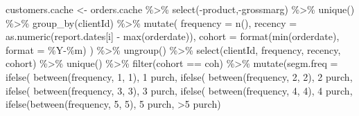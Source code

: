 \documentclass[
]{book}
\newenvironment{Shaded}{\begin{snugshade}}{\end{snugshade}}
\newcommand{\AttributeTok}[1]{\textcolor[rgb]{0.77,0.63,0.00}{#1}}
\newcommand{\DecValTok}[1]{\textcolor[rgb]{0.00,0.00,0.81}{#1}}
\newcommand{\FunctionTok}[1]{\textcolor[rgb]{0.00,0.00,0.00}{#1}}
\newcommand{\NormalTok}[1]{#1}
\newcommand{\OtherTok}[1]{\textcolor[rgb]{0.56,0.35,0.01}{#1}}
\newcommand{\SpecialCharTok}[1]{\textcolor[rgb]{0.00,0.00,0.00}{#1}}
\newcommand{\StringTok}[1]{\textcolor[rgb]{0.31,0.60,0.02}{#1}}
\begin{document}
\begin{Shaded}
\begin{Highlighting}[]
\NormalTok{    customers.cache }\OtherTok{\textless{}{-}}\NormalTok{ orders.cache }\SpecialCharTok{\%\textgreater{}\%}
        \FunctionTok{select}\NormalTok{(}\SpecialCharTok{{-}}\NormalTok{product,}\SpecialCharTok{{-}}\NormalTok{grossmarg) }\SpecialCharTok{\%\textgreater{}\%}
        \FunctionTok{unique}\NormalTok{() }\SpecialCharTok{\%\textgreater{}\%}
        \FunctionTok{group\_by}\NormalTok{(clientId) }\SpecialCharTok{\%\textgreater{}\%}
        \FunctionTok{mutate}\NormalTok{(}
            \AttributeTok{frequency =} \FunctionTok{n}\NormalTok{(),}
            \AttributeTok{recency =} \FunctionTok{as.numeric}\NormalTok{(report.dates[i] }\SpecialCharTok{{-}} \FunctionTok{max}\NormalTok{(orderdate)),}
            \AttributeTok{cohort =} \FunctionTok{format}\NormalTok{(}\FunctionTok{min}\NormalTok{(orderdate), }\AttributeTok{format =} \StringTok{\textquotesingle{}\%Y{-}\%m\textquotesingle{}}\NormalTok{)}
\NormalTok{        ) }\SpecialCharTok{\%\textgreater{}\%}
        \FunctionTok{ungroup}\NormalTok{() }\SpecialCharTok{\%\textgreater{}\%}
        \FunctionTok{select}\NormalTok{(clientId, frequency, recency, cohort) }\SpecialCharTok{\%\textgreater{}\%}
        \FunctionTok{unique}\NormalTok{() }\SpecialCharTok{\%\textgreater{}\%}
        \FunctionTok{filter}\NormalTok{(cohort }\SpecialCharTok{==}\NormalTok{ coh) }\SpecialCharTok{\%\textgreater{}\%}
        \FunctionTok{mutate}\NormalTok{(}\AttributeTok{segm.freq =} \FunctionTok{ifelse}\NormalTok{(}
            \FunctionTok{between}\NormalTok{(frequency, }\DecValTok{1}\NormalTok{, }\DecValTok{1}\NormalTok{),}
            \StringTok{\textquotesingle{}1 purch\textquotesingle{}}\NormalTok{,}
            \FunctionTok{ifelse}\NormalTok{(}
                \FunctionTok{between}\NormalTok{(frequency, }\DecValTok{2}\NormalTok{, }\DecValTok{2}\NormalTok{),}
                \StringTok{\textquotesingle{}2 purch\textquotesingle{}}\NormalTok{,}
                \FunctionTok{ifelse}\NormalTok{(}
                    \FunctionTok{between}\NormalTok{(frequency, }\DecValTok{3}\NormalTok{, }\DecValTok{3}\NormalTok{),}
                    \StringTok{\textquotesingle{}3 purch\textquotesingle{}}\NormalTok{,}
                    \FunctionTok{ifelse}\NormalTok{(}
                        \FunctionTok{between}\NormalTok{(frequency, }\DecValTok{4}\NormalTok{, }\DecValTok{4}\NormalTok{),}
                        \StringTok{\textquotesingle{}4 purch\textquotesingle{}}\NormalTok{,}
                        \FunctionTok{ifelse}\NormalTok{(}\FunctionTok{between}\NormalTok{(frequency, }\DecValTok{5}\NormalTok{, }\DecValTok{5}\NormalTok{), }\StringTok{\textquotesingle{}5 purch\textquotesingle{}}\NormalTok{, }\StringTok{\textquotesingle{}\textgreater{}5 purch\textquotesingle{}}\NormalTok{)}

\end{Highlighting}
\end{Shaded}
\end{document}
